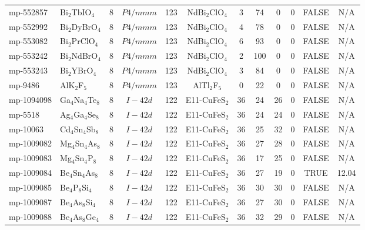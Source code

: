 {\begin{longtable}{llcccccccccc}
    mp-552857 & Bi$_{2}$TbIO$_{4}$ & 8     & $P4/mmm$ & 123   & NdBi$_{2}$ClO$_{4}$ & 3     & 74    & 0     & 0     & FALSE & N/A \\
    mp-552992 & Bi$_{2}$DyBrO$_{4}$ & 8     & $P4/mmm$ & 123   & NdBi$_{2}$ClO$_{4}$ & 4     & 78    & 0     & 0     & FALSE & N/A \\
    mp-553082 & Bi$_{2}$PrClO$_{4}$ & 8     & $P4/mmm$ & 123   & NdBi$_{2}$ClO$_{4}$ & 6     & 93    & 0     & 0     & FALSE & N/A \\
    mp-553242 & Bi$_{2}$NdBrO$_{4}$ & 8     & $P4/mmm$ & 123   & NdBi$_{2}$ClO$_{4}$ & 2     & 100   & 0     & 0     & FALSE & N/A \\
    mp-553243 & Bi$_{2}$YBrO$_{4}$ & 8     & $P4/mmm$ & 123   & NdBi$_{2}$ClO$_{4}$ & 3     & 84    & 0     & 0     & FALSE & N/A \\
    mp-9486 & AlK$_{2}$F$_{5}$ & 8     & $P4/mmm$ & 123   & AlTl$_{2}$F$_{5}$ & 0     & 22    & 0     & 0     & FALSE & N/A \\
    mp-1094098 & Ga$_{4}$Na$_{4}$Te$_{8}$ & 8     & $I-42d$ & 122   & E11-CuFeS$_{2}$ & 36    & 24    & 26    & 0     & FALSE & N/A \\
    mp-5518 & Ag$_{4}$Ga$_{4}$Se$_{8}$ & 8     & $I-42d$ & 122   & E11-CuFeS$_{2}$ & 36    & 24    & 24    & 0     & FALSE & N/A \\
    mp-10063 & Cd$_{4}$Sn$_{4}$Sb$_{8}$ & 8     & $I-42d$ & 122   & E11-CuFeS$_{2}$ & 36    & 25    & 32    & 0     & FALSE & N/A \\
    mp-1009082 & Mg$_{4}$Sn$_{4}$As$_{8}$ & 8     & $I-42d$ & 122   & E11-CuFeS$_{2}$ & 36    & 27    & 28    & 0     & FALSE & N/A \\
    mp-1009083 & Mg$_{4}$Sn$_{4}$P$_{8}$ & 8     & $I-42d$ & 122   & E11-CuFeS$_{2}$ & 36    & 17    & 25    & 0     & FALSE & N/A \\
    mp-1009084 & Be$_{4}$Sn$_{4}$As$_{8}$ & 8     & $I-42d$ & 122   & E11-CuFeS$_{2}$ & 36    & 27    & 19    & 0     & TRUE  & 12.04  \\
    mp-1009085 & Be$_{4}$P$_{8}$Si$_{4}$ & 8     & $I-42d$ & 122   & E11-CuFeS$_{2}$ & 36    & 30    & 30    & 0     & FALSE & N/A \\
    mp-1009087 & Be$_{4}$As$_{8}$Si$_{4}$ & 8     & $I-42d$ & 122   & E11-CuFeS$_{2}$ & 36    & 27    & 30    & 0     & FALSE & N/A \\
    mp-1009088 & Be$_{4}$As$_{8}$Ge$_{4}$ & 8     & $I-42d$ & 122   & E11-CuFeS$_{2}$ & 36    & 32    & 29    & 0     & FALSE & N/A \\

\end{longtable}}
